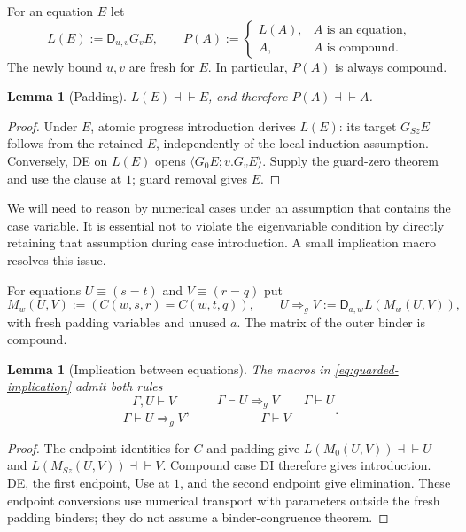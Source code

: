 \documentclass[11pt,letterpaper]{article}
\newtheorem{lemma}[theorem]{Lemma}
\theoremstyle{definition}
\newcommand{\A}{\mathcal A}
\begin{document}
For an equation $E$ let
\[
 L(E):=\mathsf D_{u,v}G_v E,
 \qquad
 P(A):=
 \begin{cases}L(A),&A\text{ is an equation},\\A,&A\text{ is compound}.
 \end{cases}
\tag{Padding}\label{eq:guarded-padding}
\]
The newly bound $u,v$ are fresh for $E$.  In particular, $P(A)$ is
always compound.

\begin{lemma}[Padding]
$L(E)\dashv\vdash E$, and therefore $P(A)\dashv\vdash A$.
\end{lemma}
\begin{proof}
Under $E$, atomic progress introduction derives $L(E)$: its target
$G_{Sz}E$ follows from the retained $E$, independently of the local
induction assumption.  Conversely, DE on $L(E)$ opens
$\langle G_0E;v.G_vE\rangle$.  Supply the guard-zero theorem and use
the clause at $1$; guard removal gives $E$.
\end{proof}

We will need to reason by numerical cases under an assumption that
contains the case variable.  It is essential not to violate the
eigenvariable condition by directly retaining that assumption during
case introduction.  A small implication macro resolves this issue.

For equations $U\equiv(s=t)$ and $V\equiv(r=q)$ put
\[
 M_w(U,V):=(C(w,s,r)=C(w,t,q)),\qquad
 U\Rightarrow_g V:=\mathsf D_{a,w}L(M_w(U,V)),
\tag{Equation implication}\label{eq:guarded-implication}
\]
with fresh padding variables and unused $a$.
The matrix of the outer binder is compound.

\begin{lemma}[Implication between equations]
The macros in \eqref{eq:guarded-implication} admit both rules
\[
 \frac{\Gamma,U\vdash V}{\Gamma\vdash U\Rightarrow_g V},
 \qquad
 \frac{\Gamma\vdash U\Rightarrow_g V\qquad\Gamma\vdash U}
      {\Gamma\vdash V}.
\]
\end{lemma}
\begin{proof}
The endpoint identities for $C$ and padding give
$L(M_0(U,V))\dashv\vdash U$ and
$L(M_{Sz}(U,V))\dashv\vdash V$.
Compound case DI therefore gives introduction.  DE, the first endpoint,
Use at $1$, and the second endpoint give elimination.  These endpoint
conversions use numerical transport with parameters outside the fresh
padding binders; they do not assume a binder-congruence theorem.
\end{proof}
\end{document}
